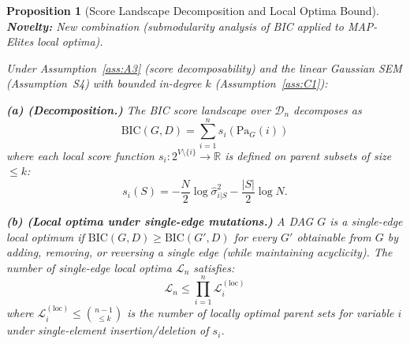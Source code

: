 \documentclass{article}
\theoremstyle{definition}
\theoremstyle{plain}
\newtheorem{proposition}{Proposition}
\theoremstyle{remark}
\begin{document}
\begin{proposition}[Score Landscape Decomposition and Local Optima Bound]
\label{prop:score_landscape}
\textbf{Novelty:} New combination (submodularity analysis of BIC applied to MAP-Elites
local optima).

Under Assumption~\ref{ass:A3} (score decomposability) and the linear Gaussian SEM
(Assumption~S4) with bounded in-degree $k$ (Assumption~\ref{ass:C1}):

\textbf{(a) (Decomposition.)} The BIC score landscape over $\mathcal{D}_n$ decomposes as
\begin{equation}
  \mathrm{BIC}(G, D) = \sum_{i=1}^{n} s_i(\mathrm{Pa}_G(i))
\end{equation}
where each local score function $s_i : 2^{V \setminus \{i\}} \to \mathbb{R}$ is defined on
parent subsets of size $\leq k$:
\begin{equation}
  s_i(S) = -\frac{N}{2}\log\hat{\sigma}^2_{i|S} - \frac{|S|}{2}\log N.
\end{equation}

\textbf{(b) (Local optima under single-edge mutations.)} A DAG $G$ is a
\emph{single-edge local optimum} if $\mathrm{BIC}(G, D) \geq \mathrm{BIC}(G', D)$ for every
$G'$ obtainable from $G$ by adding, removing, or reversing a single edge (while maintaining
acyclicity). The number of single-edge local optima $\mathcal{L}_n$ satisfies:
\begin{equation}
  \mathcal{L}_n \leq \prod_{i=1}^{n} \mathcal{L}_i^{(\mathrm{loc})}
\end{equation}
where $\mathcal{L}_i^{(\mathrm{loc})} \leq \binom{n-1}{\leq k}$ is the number of locally
optimal parent sets for variable $i$ under single-element insertion/deletion of $s_i$.
\end{proposition}
\end{document}

